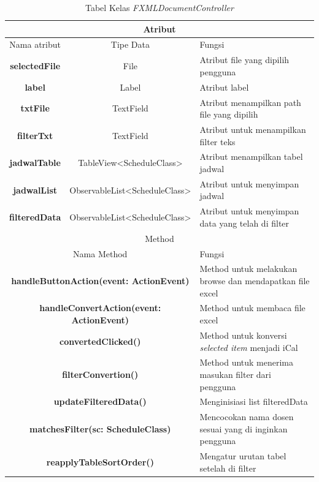 \begin{table}[H]
	\centering
		\caption{Tabel Kelas \textit{FXMLDocumentController}}
		\label{tab:FXMLDocumentController}
		\begin{tabular}{ | c | c | p{4cm} |}
			\hline
				\multicolumn{3}{|c|}{Atribut} \\ \hline 
				Nama atribut & Tipe Data  & Fungsi \\ \hline
				\textbf{selectedFile} & File & Atribut file yang dipilih pengguna\\ \hline
				\textbf{label} & Label & Atribut label\\ \hline
				\textbf{txtFile} & TextField & Atribut menampilkan path file yang dipilih\\ \hline
				\textbf{filterTxt} & TextField & Atribut untuk menampilkan filter teks\\ \hline
				\textbf{jadwalTable} & TableView<ScheduleClass> & Atribut menampilkan tabel jadwal\\ \hline
				\textbf{jadwalList} & ObservableList<ScheduleClass> & Atribut untuk menyimpan jadwal\\ \hline
				\textbf{filteredData} & ObservableList<ScheduleClass> & Atribut untuk menyimpan data yang telah di filter\\ \hline
				\multicolumn{3}{|c|}{Method} \\ \hline
				\multicolumn{2}{|c|}{Nama Method} & Fungsi \\ \hline
				\multicolumn{2}{|c|}{\textbf{handleButtonAction(event: ActionEvent)}} & Method untuk melakukan browse dan mendapatkan file excel\\ \hline
				\multicolumn{2}{|c|}{\textbf{handleConvertAction(event: ActionEvent)}} & Method untuk membaca file excel \\ \hline
				\multicolumn{2}{|c|}{\textbf{convertedClicked()}} & Method untuk konversi \textit{selected item} menjadi iCal  \\ \hline
				\multicolumn{2}{|c|}{\textbf{filterConvertion()}} & Method untuk menerima masukan filter dari pengguna \\ \hline
				\multicolumn{2}{|c|}{\textbf{updateFilteredData()}} & Menginisiasi list filteredData \\ \hline
				\multicolumn{2}{|c|}{\textbf{matchesFilter(sc: ScheduleClass)}} & Mencocokan nama dosen sesuai yang di inginkan pengguna \\ \hline
				\multicolumn{2}{|c|}{\textbf{reapplyTableSortOrder()}} & Mengatur urutan tabel setelah di filter \\ \hline
		\end{tabular}
\end{table}

